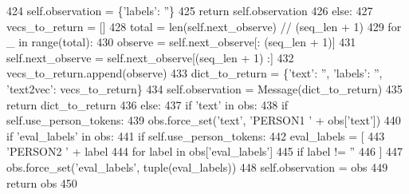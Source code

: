 \begin{DoxyCode}
424                 self.observation = \{\textcolor{stringliteral}{'labels'}: \textcolor{stringliteral}{''}\}
425                 \textcolor{keywordflow}{return} self.observation
426             \textcolor{keywordflow}{else}:
427                 vecs\_to\_return = []
428                 total = len(self.next\_observe) // (seq\_len + 1)
429                 \textcolor{keywordflow}{for} \_ \textcolor{keywordflow}{in} range(total):
430                     observe = self.next\_observe[: (seq\_len + 1)]
431                     self.next\_observe = self.next\_observe[(seq\_len + 1) :]
432                     vecs\_to\_return.append(observe)
433                 dict\_to\_return = \{\textcolor{stringliteral}{'text'}: \textcolor{stringliteral}{''}, \textcolor{stringliteral}{'labels'}: \textcolor{stringliteral}{''}, \textcolor{stringliteral}{'text2vec'}: vecs\_to\_return\}
434                 self.observation = Message(dict\_to\_return)
435                 \textcolor{keywordflow}{return} dict\_to\_return
436         \textcolor{keywordflow}{else}:
437             \textcolor{keywordflow}{if} \textcolor{stringliteral}{'text'} \textcolor{keywordflow}{in} obs:
438                 \textcolor{keywordflow}{if} self.use\_person\_tokens:
439                     obs.force\_set(\textcolor{stringliteral}{'text'}, \textcolor{stringliteral}{'PERSON1 '} + obs[\textcolor{stringliteral}{'text'}])
440             \textcolor{keywordflow}{if} \textcolor{stringliteral}{'eval\_labels'} \textcolor{keywordflow}{in} obs:
441                 \textcolor{keywordflow}{if} self.use\_person\_tokens:
442                     eval\_labels = [
443                         \textcolor{stringliteral}{'PERSON2 '} + label
444                         \textcolor{keywordflow}{for} label \textcolor{keywordflow}{in} obs[\textcolor{stringliteral}{'eval\_labels'}]
445                         \textcolor{keywordflow}{if} label != \textcolor{stringliteral}{''}
446                     ]
447                     obs.force\_set(\textcolor{stringliteral}{'eval\_labels'}, tuple(eval\_labels))
448             self.observation = obs
449             \textcolor{keywordflow}{return} obs
450 
\end{DoxyCode}
\mbox{\label{classparlai_1_1agents_1_1language__model_1_1language__model_1_1LanguageModelAgent_acd53015e95f8aead134d65e2cc8cf180}} 
